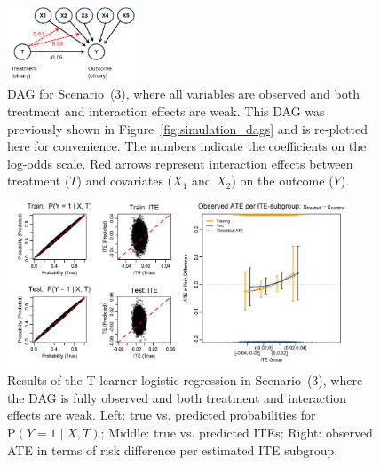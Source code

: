 \begin{figure}[htbp]
\centering
\includegraphics[width=0.35\textwidth]{img/results_ITE_simulation/simulation_small_effects.png}
\caption{DAG for Scenario~(3), where all variables are observed and both treatment and interaction effects are weak. This DAG was previously shown in Figure~\ref{fig:simulation_dags} and is re-plotted here for convenience. The numbers indicate the coefficients on the log-odds scale. Red arrows represent interaction effects between treatment ($T$) and covariates ($X_1$ and $X_2$) on the outcome ($Y$).}
\label{fig:small_interaction_dag}
\end{figure}




\begin{figure}[htbp]
\centering
\includegraphics[width=0.9\textwidth]{img/results_ITE_simulation/small_interaction_glm_tlearner.png}
\caption{Results of the T-learner logistic regression in Scenario~(3), where the DAG is fully observed and both treatment and interaction effects are weak. Left: true vs. predicted probabilities for $\text{P}(Y = 1 \mid X, T)$; Middle: true vs. predicted ITEs; Right: observed ATE in terms of risk difference per estimated ITE subgroup.}
\label{fig:small_interaction_glm_tlearner}
\end{figure}




